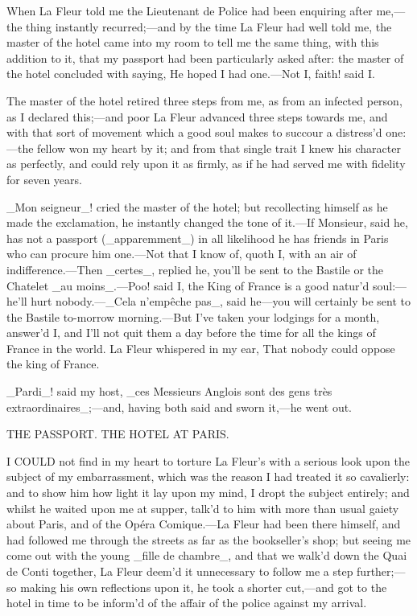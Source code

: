 \documentclass[twoside]{article}
\begin{document}
When La Fleur told me the Lieutenant de Police had been enquiring after
me,—the thing instantly recurred;—and by the time La Fleur had well told
me, the master of the hotel came into my room to tell me the same thing,
with this addition to it, that my passport had been particularly asked
after: the master of the hotel concluded with saying, He hoped I had
one.—Not I, faith! said I.

The master of the hotel retired three steps from me, as from an infected
person, as I declared this;—and poor La Fleur advanced three steps
towards me, and with that sort of movement which a good soul makes to
succour a distress’d one:—the fellow won my heart by it; and from that
single trait I knew his character as perfectly, and could rely upon it as
firmly, as if he had served me with fidelity for seven years.

_Mon seigneur_! cried the master of the hotel; but recollecting himself
as he made the exclamation, he instantly changed the tone of it.—If
Monsieur, said he, has not a passport (_apparemment_) in all likelihood
he has friends in Paris who can procure him one.—Not that I know of,
quoth I, with an air of indifference.—Then _certes_, replied he, you’ll
be sent to the Bastile or the Chatelet _au moins_.—Poo! said I, the King
of France is a good natur’d soul:—he’ll hurt nobody.—_Cela n’empêche
pas_, said he—you will certainly be sent to the Bastile to-morrow
morning.—But I’ve taken your lodgings for a month, answer’d I, and I’ll
not quit them a day before the time for all the kings of France in the
world.  La Fleur whispered in my ear, That nobody could oppose the king
of France.

_Pardi_! said my host, _ces Messieurs Anglois sont des gens très
extraordinaires_;—and, having both said and sworn it,—he went out.




THE PASSPORT.
THE HOTEL AT PARIS.


I COULD not find in my heart to torture La Fleur’s with a serious look
upon the subject of my embarrassment, which was the reason I had treated
it so cavalierly: and to show him how light it lay upon my mind, I dropt
the subject entirely; and whilst he waited upon me at supper, talk’d to
him with more than usual gaiety about Paris, and of the Opéra Comique.—La
Fleur had been there himself, and had followed me through the streets as
far as the bookseller’s shop; but seeing me come out with the young
_fille de chambre_, and that we walk’d down the Quai de Conti together,
La Fleur deem’d it unnecessary to follow me a step further;—so making his
own reflections upon it, he took a shorter cut,—and got to the hotel in
time to be inform’d of the affair of the police against my arrival.
\end{document}
